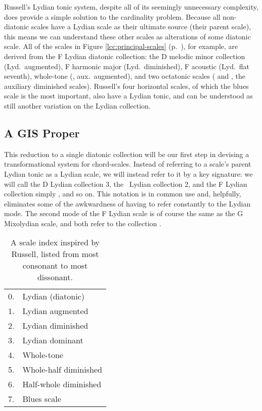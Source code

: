 Russell's Lydian tonic system, despite all of its seemingly unnecessary
complexity, does provide a simple solution to the cardinality problem. Because
all non-diatonic scales have a Lydian scale as their ultimate source (their
parent scale), this means we can understand these other scales as alterations
of some diatonic scale. All of the scales in Figure
\ref{lcc:principal-scales} (p.~\pageref{lcc:principal-scales}), for example,
are derived from the F Lydian diatonic collection: the D melodic minor
collection (Lyd.\ augmented), F harmonic major (Lyd.\ diminished), F acoustic
(Lyd.\ flat seventh), whole-tone (, aux.\ augmented), and
two octatonic scales ( and , the
auxiliary diminished scales). Russell's four horizontal scales, of which the
blues scale is the most important, also have a Lydian tonic, and can be
understood as still another variation on the Lydian collection.

\subsection{A GIS Proper}
\label{subsec:chord-scale-gis}

This reduction to a single diatonic collection will be our first step in
devising a transformational system for chord-scales. Instead of referring to a
scale's parent Lydian tonic as a Lydian scale, we will instead refer to it by
a key signature: we will call the D Lydian collection 3\sharp, the \Eflat\
Lydian collection 2\flat, and the F Lydian collection simply \nat, and so on.
This notation is in common use and, helpfully, eliminates some of the
awkwardness of having to refer constantly to the Lydian mode. The second mode
of the F Lydian scale is of course the same as the G Mixolydian scale, and
both refer to the collection \nat.

\begin{table}[tbp]
  \centering
  \begin{tabular}{rl}
    0. & Lydian (diatonic) \\
    1. & Lydian augmented \\
    2. & Lydian diminished \\
    3. & Lydian dominant \\
    4. & Whole-tone \\
    5. & Whole-half diminished \\
    6. & Half-whole diminished \\
    7. & Blues scale
  \end{tabular}
  \caption{A scale index inspired by Russell, listed from most consonant to
    most dissonant.}
  \label{cst:scale-index}
\end{table}

